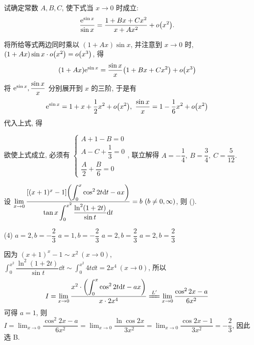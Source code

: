 \begin{example}
    试确定常数 $A,B,C$, 使下式当 $x\to0 $ 时成立:
    $$\dfrac{\mathrm{e}^{\sin x}}{\sin x}=\dfrac{1+Bx+Cx^2}{x+Ax^2}+o\qty(x^2).$$
\end{example}
\begin{solution}
    将所给等式两边同时乘以 $(1+Ax)\sin x$, 并注意到 $x\to0$ 时, $(1+Ax)\sin x\cdot o\qty(x^2)=o\qty(x^3)$, 得
    $$(1+Ax)\mathrm{e}^{\sin x}=\dfrac{\sin x}{x}\qty(1+Bx+Cx^2)+o\qty(x^3)$$
    将 $\mathrm{e}^{\sin x},\dfrac{\sin x}{x}$ 分别展开到 $x$ 的三阶, 于是有
    $$\mathrm{e}^{\sin x}=1+x+\dfrac{1}{2}x^2+o\qty(x^2),~\dfrac{\sin x}{x}=1-\dfrac{1}{6}x^2+o\qty(x^2)$$
    代入上式, 得
    欲使上式成立, 必须有 $\begin{cases}
            A+1-B=0 \\[6pt]A-C+\dfrac{1}{3}=0\\[6pt]\dfrac{A}{2}+\dfrac{B}{6}=0
        \end{cases}$, 联立解得 $A=-\dfrac{1}{4},~B=\dfrac{3}{4},~C=\dfrac{5}{12}.$
\end{solution}

\begin{example}
    设 $\displaystyle \lim_{x \to 0}\dfrac{[(x+1)^{x}-1]\qty(\displaystyle \int_{0}^{x} \cos^2 2t \dd t-ax)}{\displaystyle \tan x\int_{0}^{x^2} \dfrac{\ln^2(1+2t)}{\sin t} \dd t}=b~(b\neq 0, \infty)$, 则 (\quad).
    \begin{tasks}(4)
        \task $a=2,b=-\dfrac{2}{3}$
        \task $a=1,b=-\dfrac{2}{3}$
        \task $a=2,b=\dfrac{2}{3}$
        \task $a=2,b=\dfrac{2}{3}$
    \end{tasks}
\end{example}
\begin{solution}
    因为 $(x+1)^{x}-1\sim  x^2~(x\to0)$, $\displaystyle \int_{0}^{x^2} \dfrac{\ln^2(1+2t)}{\sin t} \dd t\sim \int_{0}^{x^2} 4t \dd t=2x^4~(x\to0)$, 所以 
    $$
    I=\lim_{x \to 0}\dfrac{x^2\cdot \qty(\displaystyle \int_{0}^{x} \cos^2 2t \dd t-ax)}{x\cdot 2x^4}\xlongequal{L'}\lim_{x \to 0}\dfrac{\cos^2 2x-a}{6x^2}
    $$
    可得 $a=1$, 则 $\displaystyle I=\lim_{x \to 0}\dfrac{\cos^2 2x-a}{6x^2}=\lim_{x \to 0}\dfrac{\ln\cos 2x}{3x^2}=\lim_{x \to 0}\dfrac{\cos 2x-1}{3x^2}=-\dfrac{2}{3}$, 因此选 B.
\end{solution}

